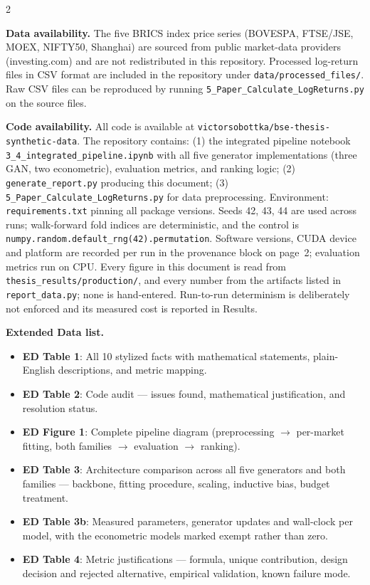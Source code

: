 \documentclass[10pt]{article}
\begin{document}
\begin{multicols}{2}
\small

\textbf{Data availability.}
The five BRICS index price series (BOVESPA, FTSE/JSE, MOEX, NIFTY50, Shanghai) are sourced from public market-data providers (investing.com) and are not redistributed in this repository. Processed log-return files in CSV format are included in the repository under \texttt{data/processed\_files/}. Raw CSV files can be reproduced by running \texttt{5\_Paper\_Calculate\_LogReturns.py} on the source files.

\textbf{Code availability.}
All code is available at \texttt{victorsobottka/bse-thesis-synthetic-data}. The repository contains: (1) the integrated pipeline notebook \texttt{3\_4\_integrated\_pipeline.ipynb} with all five generator implementations (three GAN, two econometric), evaluation metrics, and ranking logic; (2) \texttt{generate\_report.py} producing this document; (3) \texttt{5\_Paper\_Calculate\_LogReturns.py} for data preprocessing. Environment: \texttt{requirements.txt} pinning all package versions. Seeds 42, 43, 44 are used across runs; walk-forward fold indices are deterministic, and the control is \texttt{numpy.random.default\_rng(42).permutation}. Software versions, CUDA device and platform are recorded per run in the provenance block on page~2; evaluation metrics run on CPU. Every figure in this document is read from \texttt{thesis\_results/production/}, and every number from the artifacts listed in \texttt{report\_data.py}; none is hand-entered. Run-to-run determinism is deliberately not enforced and its measured cost is reported in Results.

\columnbreak

\textbf{Extended Data list.}
\begin{itemize}[noitemsep,topsep=1pt]
  \item \textbf{ED Table 1}: All 10 stylized facts with mathematical statements, plain-English descriptions, and metric mapping.
  \item \textbf{ED Table 2}: Code audit --- issues found, mathematical justification, and resolution status.
  \item \textbf{ED Figure 1}: Complete pipeline diagram (preprocessing $\to$ per-market fitting, both families $\to$ evaluation $\to$ ranking).
  \item \textbf{ED Table 3}: Architecture comparison across all five generators and both families --- backbone, fitting procedure, scaling, inductive bias, budget treatment.
  \item \textbf{ED Table 3b}: Measured parameters, generator updates and wall-clock per model, with the econometric models marked exempt rather than zero.
  \item \textbf{ED Table 4}: Metric justifications --- formula, unique contribution, design decision and rejected alternative, empirical validation, known failure mode.
\end{itemize}

\end{multicols}
\end{document}
